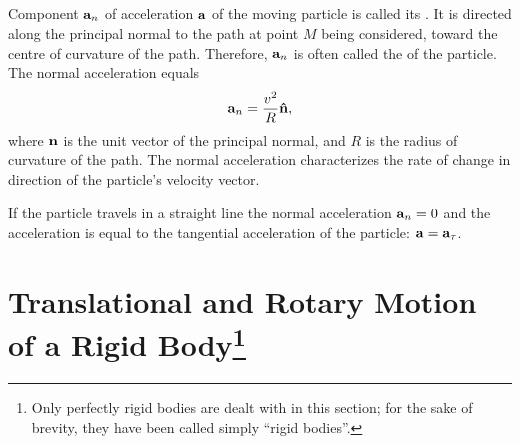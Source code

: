 \subsection{}\label{1.4.6} Component $\vb{a}_{n}$ of acceleration $\vb{a}$ of the moving particle is called its . It is directed along the principal normal to the path at point $M$ being considered, toward the centre of curvature  of the path. Therefore, $\vb{a}_{n}$ is often called the  of the particle. The normal acceleration equals
\begin{equation*}%
\vb{a}_{n} = \frac{v^{2}}{R} \vu{n},
\end{equation*}
where $\vb{n}$ is the unit vector of the principal normal, and $R$ is the radius of curvature of the path. The normal acceleration characterizes the rate of change in direction of the particle's velocity vector.

If the particle travels in a straight line the normal acceleration $\vb{a}_{n} = 0$ and the acceleration is equal to the tangential accele­ration of the particle: $\vb{a} = \vb{a}_{\tau}$.


\section[Translational and Rotary Motion of a Rigid Body]{Translational and Rotary Motion of a Rigid Body\protect\footnote{Only perfectly rigid bodies are dealt with in this section; for the sake of brevity, they have been called simply ``rigid bodies''.}}
\label{sec-01.05}

